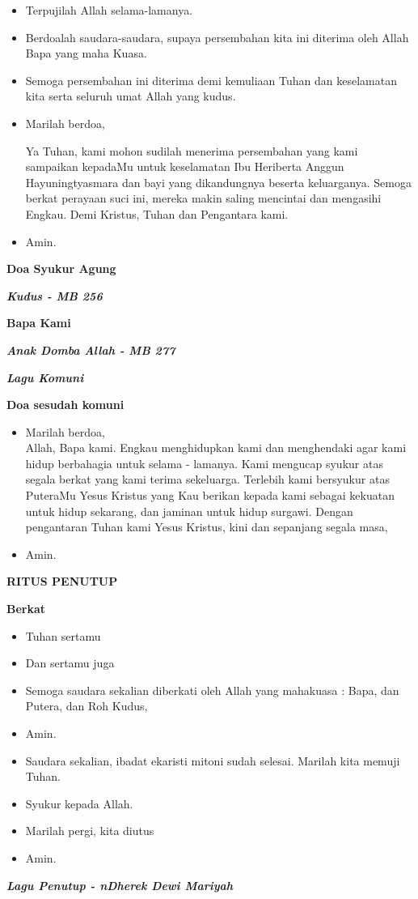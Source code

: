 \documentclass[12pt,twoside]{book}
\makeatletter
\newcommand{\judul}[1]{%
  {\parindent \z@ \centering \normalfont
    \interlinepenalty\@M \large \bfseries #1\par\nobreak \vskip 20\p@ }}
\newcommand{\subjudul}[1]{%
  {\parindent \z@ \normalfont
    \interlinepenalty\@M \bfseries #1\par\nobreak \vskip 20\p@ }}
\newcommand{\lagu}[1]{%
  {\parindent \z@ \normalfont
    \interlinepenalty\@M \bfseries \emph{#1}\par\nobreak \vskip 20\p@ }}
\newcommand{\BU}[1]{\begin{itemize} \item[U:] #1 \end{itemize}}
\newcommand{\BI}[1]{\begin{itemize} \item[I:] #1 \end{itemize}}
\newcommand{\calonibu}{Heriberta Anggun Hayuningtyasmara\xspace}
\makeatother
\begin{document}
\BU{Terpujilah Allah selama-lamanya.}
 
\BI{Berdoalah saudara-saudara, supaya persembahan kita ini diterima oleh Allah Bapa yang maha Kuasa.}
 
\BU{Semoga persembahan ini diterima demi kemuliaan Tuhan dan keselamatan kita serta seluruh umat Allah yang kudus.}
 
\BI{Marilah berdoa,

Ya Tuhan, kami mohon sudilah menerima persembahan yang kami sampaikan kepadaMu untuk keselamatan Ibu \calonibu dan bayi yang dikandungnya beserta keluarganya. Semoga berkat perayaan suci ini, mereka makin saling mencintai dan mengasihi Engkau. Demi Kristus, Tuhan dan Pengantara kami.}
 
\BU{Amin.}

\subjudul{Doa Syukur Agung}

\lagu{Kudus - MB 256}

\subjudul{Bapa Kami}

\lagu{Anak Domba Allah - MB 277}

\lagu{Lagu Komuni}

\subjudul{Doa sesudah komuni}

\BI{Marilah berdoa,\\
Allah, Bapa kami. Engkau menghidupkan kami dan menghendaki agar kami hidup berbahagia untuk selama - lamanya. Kami mengucap syukur atas segala berkat yang kami terima sekeluarga. Terlebih kami bersyukur atas PuteraMu Yesus Kristus yang Kau berikan kepada kami sebagai kekuatan untuk hidup sekarang, dan jaminan untuk hidup surgawi. Dengan pengantaran Tuhan kami Yesus Kristus, kini dan sepanjang segala masa,}
\BU{Amin.}

\judul{RITUS PENUTUP}


\subjudul{Berkat}

\BI{Tuhan sertamu}
\BU{Dan sertamu juga}
\BI{Semoga saudara sekalian diberkati oleh Allah yang mahakuasa :
\Cross {~}Bapa, dan Putera, dan Roh Kudus,}
\BU{Amin.}
\BI{Saudara sekalian, ibadat ekaristi mitoni sudah selesai.
Marilah kita memuji Tuhan.}
\BU{Syukur kepada Allah.}
\BI{Marilah pergi, kita diutus}
\BU{Amin.}

\lagu{Lagu Penutup - nDherek Dewi Mariyah}

%
\end{document}
